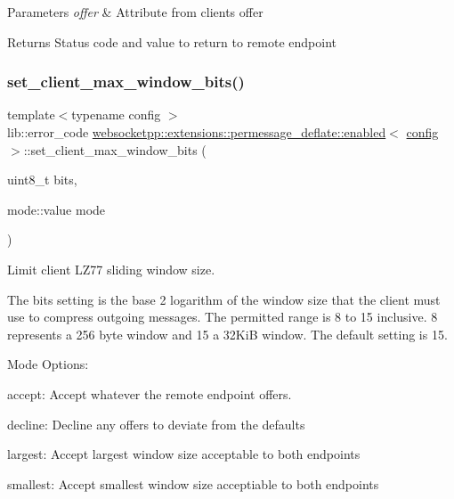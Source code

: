 \begin{DoxyParams}{Parameters}
{\em offer} & Attribute from client\textquotesingle{}s offer \\
\hline
\end{DoxyParams}
\begin{DoxyReturn}{Returns}
Status code and value to return to remote endpoint 
\end{DoxyReturn}
\mbox{\label{classwebsocketpp_1_1extensions_1_1permessage__deflate_1_1enabled_a5bfcf29752865c0e9c8e8092ee21b5af}} 
\subsubsection{\texorpdfstring{set\+\_\+client\+\_\+max\+\_\+window\+\_\+bits()}{set\_client\_max\_window\_bits()}}
{\footnotesize\ttfamily template$<$typename config $>$ \\
lib\+::error\+\_\+code \mbox{\hyperlink{classwebsocketpp_1_1extensions_1_1permessage__deflate_1_1enabled}{websocketpp\+::extensions\+::permessage\+\_\+deflate\+::enabled}}$<$ \mbox{\hyperlink{classconfig}{config}} $>$\+::set\+\_\+client\+\_\+max\+\_\+window\+\_\+bits (\begin{DoxyParamCaption}\item[{uint8\+\_\+t}]{bits,  }\item[{mode\+::value}]{mode }\end{DoxyParamCaption})\hspace{0.3cm}{\ttfamily [inline]}}



Limit client L\+Z77 sliding window size. 

The bits setting is the base 2 logarithm of the window size that the client must use to compress outgoing messages. The permitted range is 8 to 15 inclusive. 8 represents a 256 byte window and 15 a 32\+KiB window. The default setting is 15.

Mode Options\+:
\begin{DoxyItemize}
\item accept\+: Accept whatever the remote endpoint offers.
\item decline\+: Decline any offers to deviate from the defaults
\item largest\+: Accept largest window size acceptable to both endpoints
\item smallest\+: Accept smallest window size acceptiable to both endpoints
\end{DoxyItemize}

